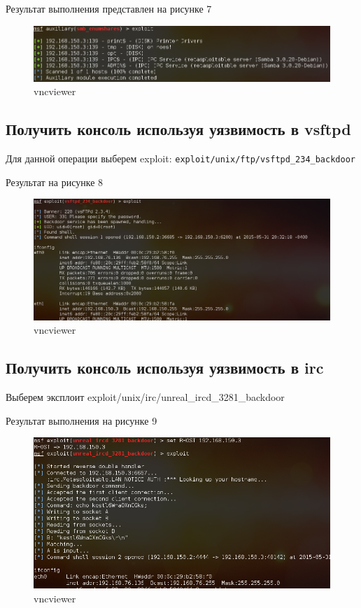 \documentclass[11pt, a4paper]{article}		%
\begin{document}
Результат выполнения представлен на рисунке 7

\begin{figure}[h!]
\centering
\includegraphics[scale=0.8]{res/smb_auxiliary}
\caption{vncviewer}
\end{figure}




\subsection{Получить консоль используя уязвимость в vsftpd}

Для данной операции выберем exploit: \verb'exploit/unix/ftp/vsftpd_234_backdoor'

Результат на рисунке 8

\begin{figure}[h!]
\centering
\includegraphics[scale=0.8]{res/vsftpd}
\caption{vncviewer}
\end{figure}



\subsection{Получить консоль используя уязвимость в irc}

Выберем эксплоит exploit/unix/irc/unreal\_ircd\_3281\_backdoor

Результат выполнения на рисунке 9

\begin{figure}[h!]
\centering
\includegraphics[scale=0.8]{res/irc}
\caption{vncviewer}
\end{figure}
\end{document}
